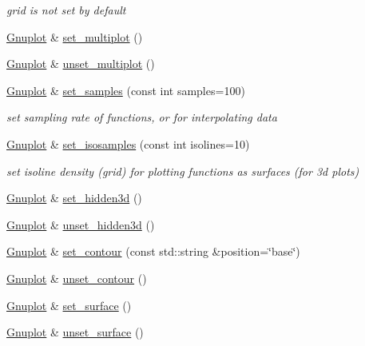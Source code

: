 \begin{DoxyCompactItemize}
\begin{DoxyCompactList}\small\item\em grid is not set by default \end{DoxyCompactList}\item 
\hyperlink{classGnuplot}{Gnuplot} \& \hyperlink{classGnuplot_a67efc4d4dc46b6100d14ba2f7366ef11}{set\+\_\+multiplot} ()
\item 
\hyperlink{classGnuplot}{Gnuplot} \& \hyperlink{classGnuplot_aad76cdec16cfb5fdf82f45ed2786f4d8}{unset\+\_\+multiplot} ()
\item 
\mbox{\label{classGnuplot_a671cbe7b18a267ea59f532c83a0035f6}} 
\hyperlink{classGnuplot}{Gnuplot} \& \hyperlink{classGnuplot_a671cbe7b18a267ea59f532c83a0035f6}{set\+\_\+samples} (const int samples=100)
\begin{DoxyCompactList}\small\item\em set sampling rate of functions, or for interpolating data \end{DoxyCompactList}\item 
\mbox{\label{classGnuplot_ab810fa4c02fb49ae197786c305b78702}} 
\hyperlink{classGnuplot}{Gnuplot} \& \hyperlink{classGnuplot_ab810fa4c02fb49ae197786c305b78702}{set\+\_\+isosamples} (const int isolines=10)
\begin{DoxyCompactList}\small\item\em set isoline density (grid) for plotting functions as surfaces (for 3d plots) \end{DoxyCompactList}\item 
\hyperlink{classGnuplot}{Gnuplot} \& \hyperlink{classGnuplot_a891f9800705eddc3f73886f265c009b8}{set\+\_\+hidden3d} ()
\item 
\hyperlink{classGnuplot}{Gnuplot} \& \hyperlink{classGnuplot_ab8688182047f746090e1e5f2a8c11c9e}{unset\+\_\+hidden3d} ()
\item 
\hyperlink{classGnuplot}{Gnuplot} \& \hyperlink{classGnuplot_af845efc728a90d7e10de764eff0b2423}{set\+\_\+contour} (const std\+::string \&position=\char`\"{}base\char`\"{})
\item 
\hyperlink{classGnuplot}{Gnuplot} \& \hyperlink{classGnuplot_a0b8522cb81e46dd4f5a22b7b48f977b1}{unset\+\_\+contour} ()
\item 
\hyperlink{classGnuplot}{Gnuplot} \& \hyperlink{classGnuplot_a9825bd26500e30ca88404c4807e6607a}{set\+\_\+surface} ()
\item 
\hyperlink{classGnuplot}{Gnuplot} \& \hyperlink{classGnuplot_a4ebddacbec61aa3e7bc4b89f508ad621}{unset\+\_\+surface} ()

\end{DoxyCompactItemize}
